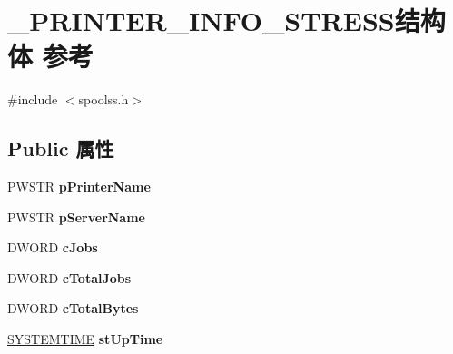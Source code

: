 \hypertarget{struct___p_r_i_n_t_e_r___i_n_f_o___s_t_r_e_s_s}{}\section{\+\_\+\+P\+R\+I\+N\+T\+E\+R\+\_\+\+I\+N\+F\+O\+\_\+\+S\+T\+R\+E\+S\+S结构体 参考}
\label{struct___p_r_i_n_t_e_r___i_n_f_o___s_t_r_e_s_s}


{\ttfamily \#include $<$spoolss.\+h$>$}

\subsection*{Public 属性}
\begin{DoxyCompactItemize}
\item 
\mbox{\label{struct___p_r_i_n_t_e_r___i_n_f_o___s_t_r_e_s_s_ae775cd770de1edb41ff85569d8c9eb68}} 
P\+W\+S\+TR {\bfseries p\+Printer\+Name}
\item 
\mbox{\label{struct___p_r_i_n_t_e_r___i_n_f_o___s_t_r_e_s_s_acccc66a9adb580444e8a6b3a0e2b5ad5}} 
P\+W\+S\+TR {\bfseries p\+Server\+Name}
\item 
\mbox{\label{struct___p_r_i_n_t_e_r___i_n_f_o___s_t_r_e_s_s_a7b901098f812db21598d997501b58bc7}} 
D\+W\+O\+RD {\bfseries c\+Jobs}
\item 
\mbox{\label{struct___p_r_i_n_t_e_r___i_n_f_o___s_t_r_e_s_s_a3137b2800ee0b9c4f99a51cddc72626b}} 
D\+W\+O\+RD {\bfseries c\+Total\+Jobs}
\item 
\mbox{\label{struct___p_r_i_n_t_e_r___i_n_f_o___s_t_r_e_s_s_a81d9158365aa3e5b47b420d5932f49c1}} 
D\+W\+O\+RD {\bfseries c\+Total\+Bytes}
\item 
\mbox{\label{struct___p_r_i_n_t_e_r___i_n_f_o___s_t_r_e_s_s_a822cbb20a0df2445e7fd981f9ba11ae4}} 
\hyperlink{struct___s_y_s_t_e_m_t_i_m_e}{S\+Y\+S\+T\+E\+M\+T\+I\+ME} {\bfseries st\+Up\+Time}

\end{DoxyCompactItemize}

